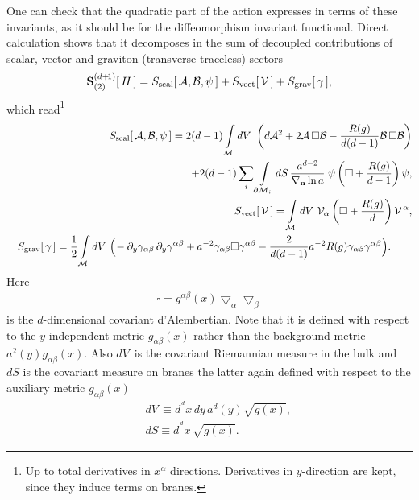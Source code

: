 \documentclass[a4paper,12pt]{article}
\newcommand{\za}{{\alpha}}   %
\newcommand{\zb}{{\beta}}    %
\newcommand{\ddim}{{d}}
\newcommand{\DDim}{{(d+\!1)}}
\newcommand{\M}{{\cal M}}
\newcommand{\dM}{{\partial \cal M}}
\newcommand{\dx}{{d^{^{\,\ddim}} \!x}}
\newcommand{\un}{\mathbf n} %
\newcommand{\ddy}{{\partial_y}}
\newcommand{\bBox}{\square}  %
\newcommand{\bnabla}{\bigtriangledown}  %
\newcommand{\Bnabla}{\nabla}  %
\newcommand{\dV}{dV\,}
\newcommand{\dS}{dS}
\begin{document}
One can check that the quadratic part of the action expresses in
terms of these invariants, as it should be for the diffeomorphism
invariant functional. Direct calculation shows that it decomposes
in the sum of decoupled contributions of scalar, vector and
graviton (transverse-traceless) sectors
    \begin{eqnarray}
     \mathbf{S}^\DDim_{(2)}[\,H\,]=
     S_{\mathrm{scal}}[\,\A,\B,\psi\,]+
     S_{\mathrm{vect}}[\,\V\,]
     +S_{\mathrm{grav}}[\,\gamma\,],\label{QuadrActionDecomposition}
    \end{eqnarray}
which read\footnote{Up to total derivatives in $x^\za$ directions.
Derivatives in $y$-direction are kept, since they induce terms on
branes.}
    \begin{eqnarray}
     &&S_{\mathrm{scal}}[\,\A,\B,\psi\,]=
     2(\ddim-1)\int\limits_{\M}\dV\,
     \left(\ddim\A^2+2\A\,\bBox\B-
     \frac{R(g)}{\ddim(\ddim-1)}\B\,\bBox\B\right)\nonumber\\
     &&\qquad\qquad\qquad\qquad\qquad\qquad
     +2(\ddim-1)\sum_i\int
     \limits_{\dM_i}\dS\,
     \frac{a^{\ddim-2}}{\Bnabla_{\un}\ln{a}}\;
     \psi\left(\bBox
     +\frac{R(g)}{\ddim-1}\right)\psi,    \label{scalarpart}    \\
    &&S_{\mathrm{vect}}[\,\V\,]=
     \int\limits_{\M}\dV\,
     \V_{\za}\left(\bBox
     +\frac{R(g)}{\ddim}\right)\V^{\,\za},   \label{vectorpart}\\
     &&S_{\mathrm{grav}}[\,\gamma\,]=
    \frac12 \int\limits_{\M}\dV\,
     \Big(\!-\ddy\gamma_{\za\zb}\,
    \ddy\gamma^{\za\zb}
     +a^{-2}\gamma_{\za\zb}\bBox\gamma^{\za\zb}
     -\frac2{\ddim(\ddim-1)}a^{-2}R(g)
    \gamma_{\za\zb}
    \gamma^{\za\zb}\Big).\qquad               \label{gravitonpart}
    \end{eqnarray}
Here
      \begin{eqnarray}
        \bBox=g^{\za\zb}(x)\!
        \bnabla_{\!\za}\!\bnabla_{\!\zb}   \label{DefDalambertian}
      \end{eqnarray}
is the $\ddim$-dimensional covariant d'Alembertian. Note that it
is defined with respect to the $y$-independent metric
$g_{\za\zb}(x)$ rather than the background metric
$a^2(y)g_{\za\zb}(x)$. Also $\dV$ is the covariant Riemannian
measure in the bulk and $\dS$ is the covariant measure on branes
the latter again defined with respect to the auxiliary metric
$g_{\za\zb}(x)$
        \begin{eqnarray}
        &&\dV\equiv \dx\,dy\,
        a^\ddim(y)\sqrt{g(x)},          \label{MeasureBulk}\\
        &&\dS\equiv\dx\,\sqrt{g(x)}.    \label{MeasureBrane}
        \end{eqnarray}
\end{document}
